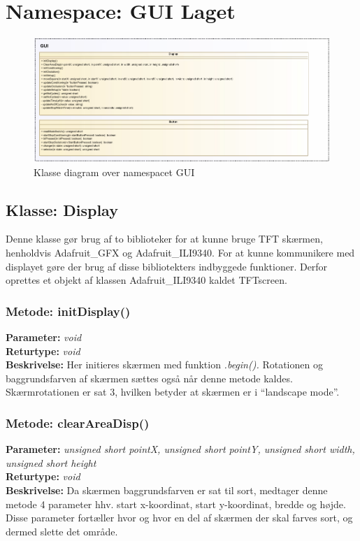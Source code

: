 \section{Namespace: GUI Laget}

\begin{figure}[H]
	\includegraphics[width=\textwidth]{klassediagram_GUI-crop.pdf}
	\caption{Klasse diagram over namespacet GUI}\label{fig:classDiagramGUI}
\end{figure}

\subsection{Klasse: Display}
Denne klasse gør brug af to biblioteker for at kunne bruge TFT skærmen, henholdvis Adafruit\_GFX og Adafruit\_ILI9340. For at kunne kommunikere med displayet gøre der brug af disse bibliotekters indbyggede funktioner. Derfor oprettes et objekt af klassen Adafruit\_ILI9340 kaldet TFTscreen.

\subsubsection{Metode: initDisplay()}
\textbf{Parameter: } \textit{void}
\\ \textbf{Returtype: } \textit{void}
\\ \textbf{Beskrivelse: } Her initieres skærmen med funktion \textit{.begin().} Rotationen og baggrundsfarven af skærmen sættes også når denne metode kaldes. Skærmrotationen er sat 3, hvilken betyder at skærmen er i “landscape mode”. 

\subsubsection{Metode: clearAreaDisp()}
\textbf{Parameter: } \textit{unsigned short pointX, unsigned short pointY, unsigned short width, unsigned short height}
\\ \textbf{Returtype: } \textit{void}
\\ \textbf{Beskrivelse: } Da skærmen baggrundsfarven er sat til sort, medtager denne metode 4 parameter hhv. start x-koordinat, start y-koordinat, bredde og højde. Disse parameter fortæller hvor og hvor en del af skærmen der skal farves sort, og dermed slette det område.

